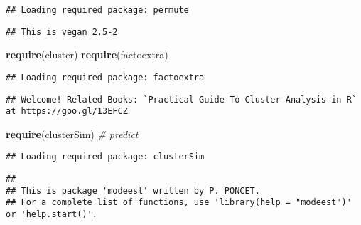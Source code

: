 \documentclass[]{article}
\newenvironment{Shaded}{\begin{snugshade}}{\end{snugshade}}
\newcommand{\KeywordTok}[1]{\textcolor[rgb]{0.13,0.29,0.53}{\textbf{#1}}}
\newcommand{\CommentTok}[1]{\textcolor[rgb]{0.56,0.35,0.01}{\textit{#1}}}
\newcommand{\NormalTok}[1]{#1}
\begin{document}
\begin{verbatim}
## Loading required package: permute
\end{verbatim}

\begin{verbatim}
## This is vegan 2.5-2
\end{verbatim}

\begin{Shaded}
\begin{Highlighting}[]
\KeywordTok{require}\NormalTok{(cluster)}
\KeywordTok{require}\NormalTok{(factoextra)}
\end{Highlighting}
\end{Shaded}

\begin{verbatim}
## Loading required package: factoextra
\end{verbatim}

\begin{verbatim}
## Welcome! Related Books: `Practical Guide To Cluster Analysis in R` at https://goo.gl/13EFCZ
\end{verbatim}

\begin{Shaded}
\begin{Highlighting}[]
\KeywordTok{require}\NormalTok{(clusterSim) }\CommentTok{# predict}
\end{Highlighting}
\end{Shaded}

\begin{verbatim}
## Loading required package: clusterSim
\end{verbatim}

\begin{verbatim}
## 
## This is package 'modeest' written by P. PONCET.
## For a complete list of functions, use 'library(help = "modeest")' or 'help.start()'.
\end{verbatim}
\end{document}
